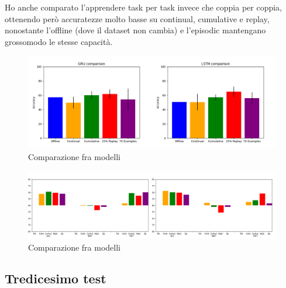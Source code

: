 \documentclass[11pt, a4paper, twoside, openright]{book}
\begin{document}
Ho anche comparato l'apprendere task per task invece che coppia per coppia, ottenendo però accuratezze molto basse su continual, cumulative e replay, nonostante l'offline (dove il dataset non cambia) e l'episodic mantengano grossomodo le stesse capacità.

\begin{figure}[h]
    \centering
    \includegraphics[scale=0.5]{img/autotestv.png}
    \caption{Comparazione fra modelli}
    \label{fig:autotest_comparison}
\end{figure}

\begin{figure}[h]
    \centering
    \includegraphics[scale=0.33]{img/autotestv_accbwtfwt.png}
    \caption{Comparazione fra modelli}
    \label{fig:autotest_comparison_metrics}
\end{figure}
\subsection{Tredicesimo test}
\end{document}
